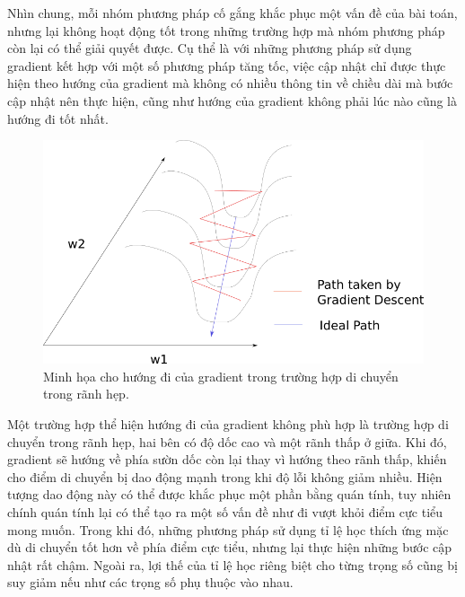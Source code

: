 Nhìn chung, mỗi nhóm phương pháp cố gắng khắc phục một vấn đề của bài toán, nhưng lại không hoạt động tốt trong những trường hợp mà nhóm phương pháp còn lại có thể giải quyết được. Cụ thể là với những phương pháp sử dụng gradient kết hợp với một số phương pháp tăng tốc, việc cập nhật chỉ được thực hiện theo hướng của gradient mà không có nhiều thông tin về chiều dài mà bước cập nhật nên thực hiện, cũng như hướng của gradient không phải lúc nào cũng là hướng đi tốt nhất.

\begin{figure}[htp]
\centering
\includegraphics[width=100 mm]{images/valley.png}
\caption{Minh họa cho hướng đi của gradient trong trường hợp di chuyển trong rãnh hẹp. \cite{gradientvalley}}
\label{fig:valley}
\end{figure}

Một trường hợp thể hiện hướng đi của gradient không phù hợp là trường hợp di chuyển trong rãnh hẹp, hai bên có độ dốc cao và một rãnh thấp ở giữa. Khi đó, gradient sẽ hướng về phía sườn dốc còn lại thay vì hướng theo rãnh thấp, khiến cho điểm di chuyển bị dao động mạnh trong khi độ lỗi không giảm nhiều. Hiện tượng dao động này có thể được khắc phục một phần bằng quán tính, tuy nhiên chính quán tính lại có thể tạo ra một số vấn đề như đi vượt khỏi điểm cực tiểu mong muốn. Trong khi đó, những phương pháp sử dụng tỉ lệ học thích ứng mặc dù di chuyển tốt hơn về phía điểm cực tiểu, nhưng lại thực hiện những bước cập nhật rất chậm. Ngoài ra, lợi thế của tỉ lệ học riêng biệt cho từng trọng số cũng bị suy giảm nếu như các trọng số phụ thuộc vào nhau.


